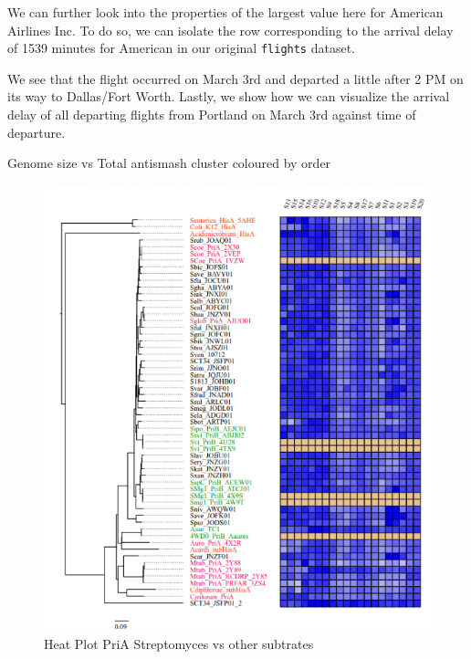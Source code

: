 \documentclass[12pt,twoside]{reedthesis}
\begin{document}
  We can further look into the properties of the largest value here for
  American Airlines Inc. To do so, we can isolate the row corresponding to
  the arrival delay of 1539 minutes for American in our original
  \texttt{flights} dataset.
  
  \begin{Shaded}
  \end{Shaded}
  
  We see that the flight occurred on March 3rd and departed a little after
  2 PM on its way to Dallas/Fort Worth. Lastly, we show how we can
  visualize the arrival delay of all departing flights from Portland on
  March 3rd against time of departure.
  
  \begin{Shaded}
  \end{Shaded}
  
  Genome size vs Total antismash cluster coloured by order
  
  \begin{figure}[h!tbp]
  \centering
  \includegraphics[angle = 0,scale = 0.6]{chapter2/PriAHeatPot.png}
  \caption[Heat Plot PriA Streptomyces vs other subtrates]{\normalsize{Heat Plot PriA Streptomyces vs other subtrates}}
  \label{fig:PriADocking}
  \end{figure}
  
\end{document}
